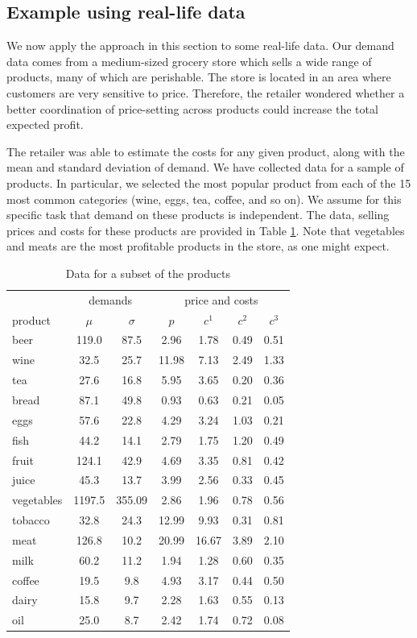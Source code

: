 \documentclass[a4paper,11pt]{article}
\begin{document}
\subsection{Example using real-life data}
\label{sub:price3}

We now apply the approach in this section to some real-life data. Our demand data comes from a medium-sized grocery store which sells a wide range of products, many of which are perishable. The store is located in an area where customers are very sensitive to price. Therefore, the retailer wondered whether a better coordination of price-setting across products could increase the total expected profit.

The retailer was able to estimate the costs for any given product, along with the mean and standard deviation of demand. We have collected data for a sample of products. In particular, we selected the most popular product from each of the 15 most common categories (wine, eggs, tea, coffee, and so on). We assume for this specific task that demand on these products is independent. The data, selling prices and costs for these products are provided in Table \ref{tab:real_par}. Note that vegetables and meats are the most profitable products in the store, as one might expect.

\begin{table}[htb]
\centering
\caption{Data for a subset of the products}
\label{tab:real_par}
\begin{tabular}{lcc cccc}
\toprule
& \multicolumn{2}{c}{demands} & \multicolumn{4}{c}{price and costs}\\
\cmidrule(lr){2-3} \cmidrule(lr){4-7}
product & $\mu$ & $\sigma$ & $p$ & $c^1$ & $c^2$ & $c^3$\\
\midrule
beer & 119.0 & 87.5 & 2.96 & 1.78 & 0.49 & 0.51\\
wine & 32.5 & 25.7 & 11.98 & 7.13 & 2.49 & 1.33\\
tea & 27.6 & 16.8 & 5.95 & 3.65 & 0.20 & 0.36\\
bread & 87.1 & 49.8 & 0.93 & 0.63 & 0.21 & 0.05\\
eggs & 57.6 & 22.8 & 4.29 & 3.24 & 1.03 & 0.21\\
\addlinespace
fish & 44.2 & 14.1 & 2.79 & 1.75 & 1.20 & 0.49\\
fruit & 124.1 & 42.9 & 4.69 & 3.35 & 0.81 & 0.42\\
juice & 45.3 & 13.7 & 3.99 & 2.56 & 0.33 & 0.45\\
vegetables & 1197.5 & 355.09 & 2.86 & 1.96 & 0.78 & 0.56\\
tobacco & 32.8 & 24.3 & 12.99 & 9.93 & 0.31 & 0.81\\
\addlinespace
meat & 126.8 & 10.2 & 20.99 & 16.67 & 3.89 & 2.10\\
milk & 60.2 & 11.2 & 1.94 & 1.28 & 0.60 & 0.35\\
coffee & 19.5 & 9.8 & 4.93 & 3.17 & 0.44 & 0.50\\
dairy & 15.8 & 9.7 & 2.28 & 1.63 & 0.55 & 0.13\\
oil & 25.0 & 8.7 & 2.42 & 1.74 & 0.72 & 0.08\\
\bottomrule
\end{tabular}
\end{table}
\end{document}
